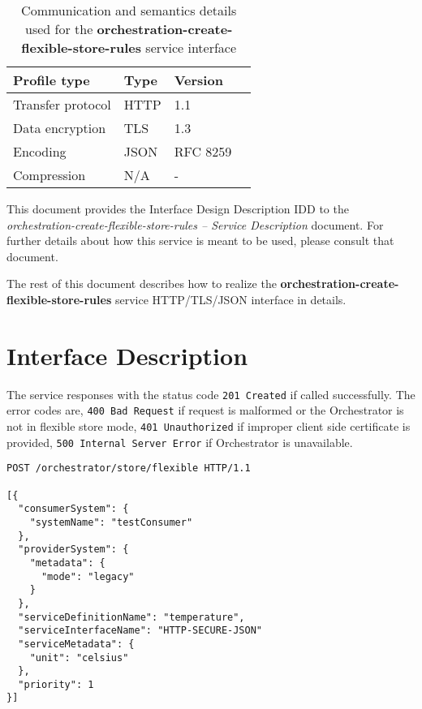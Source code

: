 \documentclass[a4paper]{arrowhead}
\newcommand{\fref}[1]{{\textcolor{ArrowheadBlue}{\hyperref[sec:functions:#1]{#1}}}}
\begin{document}
\begin{table}[ht!]
  \centering
  \begin{tabular}{|l|l|l|l|}
    \rowcolor{gray!33} Profile type & Type & Version \\ \hline
    Transfer protocol & HTTP & 1.1 \\ \hline
    Data encryption & TLS & 1.3 \\ \hline
    Encoding & JSON & RFC 8259 \cite{rfc8259} \\ \hline
    Compression & N/A & - \\ \hline
  \end{tabular}
  \caption{Communication and semantics details used for the \textbf{orchestration-create-flexible-store-rules} service interface}
  \label{tab:comunication_semantics_profile}
\end{table}

This document provides the Interface Design Description IDD to the \textit{orchestration-create-flexible-store-rules -- Service Description} document.
For further details about how this service is meant to be used, please consult that document.

The rest of this document describes how to realize the \textbf{orchestration-create-flexible-store-rules} service HTTP/TLS/JSON interface in details.

\newpage

\section{Interface Description}
\label{sec:functions}

The service responses with the status code \texttt{201 Created} if called successfully. The error codes are, \texttt{400 Bad Request} if request is malformed or the Orchestrator is not in flexible store mode, \texttt{401 Unauthorized} if improper client side certificate is provided, \texttt{500 Internal Server Error} if Orchestrator is unavailable.

\begin{lstlisting}[language=http,label={lst:orchestration-create-flexible-store-rules},caption={An \fref{orchestration-create-flexible-store-rules} invocation.}]
POST /orchestrator/store/flexible HTTP/1.1

[{
  "consumerSystem": {
    "systemName": "testConsumer"
  },
  "providerSystem": {
    "metadata": {
      "mode": "legacy"
    }
  },
  "serviceDefinitionName": "temperature",
  "serviceInterfaceName": "HTTP-SECURE-JSON"
  "serviceMetadata": {
    "unit": "celsius"
  },
  "priority": 1
}]
\end{lstlisting}
\end{document}
